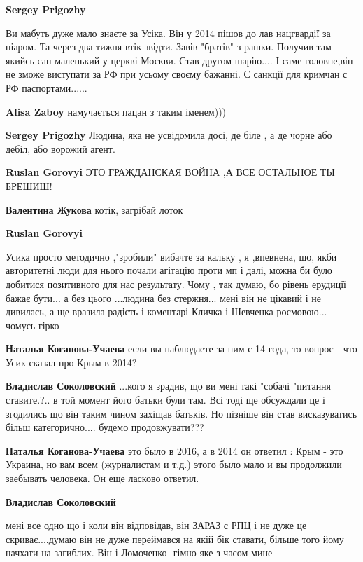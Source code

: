 \begin{itemize}
\begin{itemize}
\textbf{Sergey Prigozhy} 

Ви мабуть дуже мало знаєте за Усіка. Він у 2014 пішов до лав нацгвардії за
піаром. Та через два тижня втік звідти. Завів "братів" з рашки. Получив там
якийсь сан маленький у церкві Москви. Став другом шарію.... І саме головне,він
не зможе виступати за РФ при усьому своєму бажанні. Є санкції для кримчан с РФ
паспортами......



\textbf{Alisa Zaboy} намучається пацан з таким іменем)))

\textbf{Sergey Prigozhy} Людина, яка не усвідомила досі, де біле , а де чорне або дебіл, або ворожий агент.

\textbf{Ruslan Gorovyi} ЭТО ГРАЖДАНСКАЯ ВОЙНА ,А ВСЕ ОСТАЛЬНОЕ ТЫ БРЕШИШ!


\textbf{Валентина Жукова} котік, загрібай лоток

\textbf{Ruslan Gorovyi} 

Усика просто методично ,"зробили" вибачте за кальку , я ,впевнена, що, якби
авторитетні люди для нього почали агітацію проти мп і далі, можна би було
добитися позитивного для нас результату. Чому , так думаю, бо рівень ерудиції
бажає бути... а без цього ...людина без стержня... мені він не цікавий і не
дивилась, а ще вразила радість і коментарі Кличка і Шевченка росмовою... чомусь
гірко

\textbf{Наталья Коганова-Учаева} если вы наблюдаете за ним с 14 года, то вопрос - что Усик сказал про Крым в 2014?

\textbf{Владислав Соколовский} ...кого я зрадив, що ви мені такі "собачі "питання ставите.?.. в той момент його батьки були там. Всі тоді ще обсуждали це і згодились що він таким чином захіщав батьків. Но пізніше він став висказуватись більш категорично.... будемо продовжувати???

\textbf{Наталья Коганова-Учаева} это было в 2016, а в 2014 он ответил : Крым - это Украина, но вам всем (журналистам и т.д.) этого было мало и вы продолжили заебывать человека. Он еще ласково ответил.

\textbf{Владислав Соколовский} 

мені все одно що і коли він відповідав, він ЗАРАЗ с РПЦ і не дуже це
скриває....думаю він не дуже переймався на якій бік ставати, більше того йому
начхати на загиблих. Він і Ломоченко -гімно яке з часом мине



\end{itemize}
\end{itemize}
